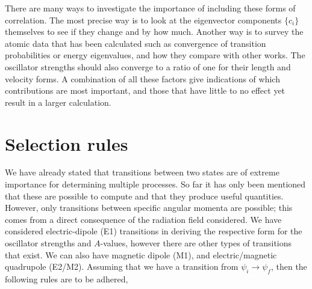 There are many ways to investigate the importance of including these forms of correlation. The most precise way is to look at the eigenvector components $\{c_i\}$ themselves to see if they change and by how much. Another way is to survey the atomic data that has been calculated such as convergence of transition probabilities or energy eigenvalues, and how they compare with other works. The oscillator strengths should also converge to a ratio of one for their length and velocity forms. A combination of all these factors give indications of which contributions are most important, and those that have little to no effect yet result in a larger calculation.

\section{Selection rules}\label{sec:many_selection}
We have already stated that transitions between two states are of extreme importance for determining multiple processes. So far it has only been mentioned that these are possible to compute and that they produce useful quantities. However, only transitions between specific angular momenta are possible; this comes from a direct consequence of the radiation field considered. We have considered electric-dipole (E1) transitions in deriving the respective form for the oscillator strengths and $A$-values, however there are other types of transitions that exist. We can also have magnetic dipole (M1), and electric/magnetic quadrupole (E2/M2). Assuming that we have a transition from $\psi_i\rightarrow\psi_f$, then the following rules are to be adhered,

